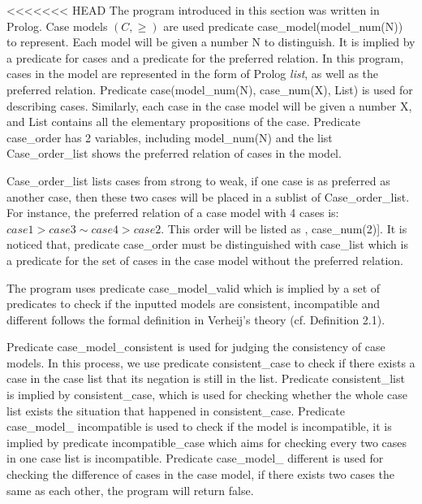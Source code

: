 \documentclass{IOS-Book-Article}
\begin{document}


<<<<<<< HEAD
\noindent The program introduced in this section was written in Prolog. Case models $(C, \geq)$ are used predicate {\mf case\_model(model\_num(N))} to represent. Each model will be given a number N to distinguish. It is implied by a predicate for cases and a predicate for the preferred relation. In this program, cases in the model are represented in the form of Prolog \textit{list}, as well as the preferred relation. Predicate {\mf case(model\_num(N), case\_num(X), List)} is used for describing cases. Similarly, each case in the case model will be given a number {\mf X}, and {\mf List} contains all the elementary propositions of the case. Predicate {\mf case\_order} has 2 variables, including {\mf model\_num(N)} and the list {\mf Case\_order\_list} shows the preferred relation of cases in the model. 

{\mf Case\_order\_list} lists cases from strong to weak, if one case is as preferred as another case, then these two cases will be placed in a sublist of {\mf Case\_order\_list}. For instance, the preferred relation of a case model with 4 cases is: $case 1 > case 3 \sim case 4 > case 2$. This order will be listed as {\mf [case\_num(1), [case\_num(3), case\_num(4)], case\_num(2)]}. It is noticed that, predicate {\mf case\_order} must be distinguished with {\mf case\_list} which is a predicate for the set of cases in the case model without the preferred relation.

The program uses predicate {\mf case\_model\_valid} which is implied by a set of predicates to check if the inputted models are consistent, incompatible and different follows the formal definition in Verheij's theory (cf. Definition 2.1).

Predicate {\mf case\_model\_consistent} is used for judging the consistency of case models. In this process, we use predicate {\mf consistent\_case} to check if there exists a case in the case list that its negation is still in the list. Predicate {\mf consistent\_list} is implied by {\mf consistent\_case}, which is used for checking whether the whole case list exists the situation that happened in {\mf consistent\_case}. Predicate {\mf case\_model\_ incompatible} is used to check if the model is incompatible, it is implied by predicate {\mf incompatible\_case} which aims for checking every two cases in one case list is incompatible. Predicate {\mf case\_model\_ different} is used for checking the difference of cases in the case model, if there exists two cases the same as each other, the program will return {\mf false}.
\end{document}
